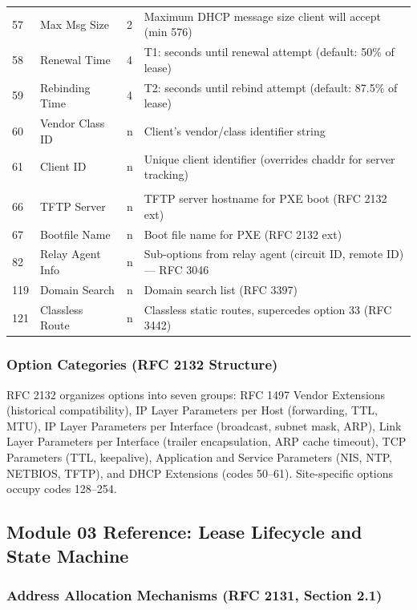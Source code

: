\documentclass[11pt,letterpaper]{article}
\begin{document}
\begin{center}
\begin{longtable}{C{1.2cm}L{3.5cm}C{1.2cm}L{5cm}}
57 & Max Msg Size & 2 & Maximum DHCP message size client will accept (min 576) \\
58 & Renewal Time & 4 & T1: seconds until renewal attempt (default: 50\% of lease) \\
59 & Rebinding Time & 4 & T2: seconds until rebind attempt (default: 87.5\% of lease) \\
60 & Vendor Class ID & n & Client's vendor/class identifier string \\
61 & Client ID & n & Unique client identifier (overrides chaddr for server tracking) \\
\midrule
{}
 \\
66 & TFTP Server & n & TFTP server hostname for PXE boot (RFC 2132 ext) \\
67 & Bootfile Name & n & Boot file name for PXE (RFC 2132 ext) \\
82 & Relay Agent Info & n & Sub-options from relay agent (circuit ID, remote ID) --- RFC 3046 \\
119 & Domain Search & n & Domain search list (RFC 3397) \\
121 & Classless Route & n & Classless static routes, supercedes option 33 (RFC 3442) \\
\bottomrule
\end{longtable}
\end{center}

\subsubsection{Option Categories (RFC 2132 Structure)}

RFC 2132 organizes options into seven groups: RFC 1497 Vendor Extensions (historical compatibility), IP Layer Parameters per Host (forwarding, TTL, MTU), IP Layer Parameters per Interface (broadcast, subnet mask, ARP), Link Layer Parameters per Interface (trailer encapsulation, ARP cache timeout), TCP Parameters (TTL, keepalive), Application and Service Parameters (NIS, NTP, NETBIOS, TFTP), and DHCP Extensions (codes 50--61). Site-specific options occupy codes 128--254.

\subsection{Module 03 Reference: Lease Lifecycle and State Machine}

\subsubsection{Address Allocation Mechanisms (RFC 2131, Section 2.1)}
\end{document}
